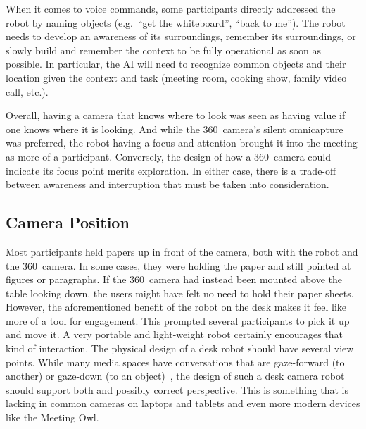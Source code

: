\documentclass{tufte-handout}
\begin{document}
When it comes to voice commands, some participants directly addressed
the robot by naming objects (e.g.\ ``get the whiteboard'', ``back to
me'').  The robot needs to develop an awareness of its surroundings,
remember its surroundings, or slowly build and remember the context to
be fully operational as soon as possible. In particular, the AI will
need to recognize common objects and their location given the context
and task (meeting room, cooking show, family video call, etc.).

Overall, having a camera that knows where to look was seen as having
value if one knows where it is looking.  And while the 360\textdegree\
camera's silent omnicapture was preferred, the robot having a focus
and attention brought it into the meeting as more of a
participant. Conversely, the design of how a 360\textdegree\ camera
could indicate its focus point merits exploration. In either case,
there is a trade-off between awareness and interruption that must be
taken into consideration.

\subsection{Camera Position}
Most participants held papers up in front of the camera, both with the
robot and the 360\textdegree\ camera. In some cases, they were holding
the paper and still pointed at figures or paragraphs. If the
360\textdegree\ camera had instead been mounted above the table
looking down, the users might have felt no need to hold their paper
sheets. However, the aforementioned benefit of the robot on the desk
makes it feel like more of a tool for engagement. This prompted
several participants to pick it up and move it. A very portable and
light-weight robot certainly encourages that kind of interaction.  The
physical design of a desk robot should have several view points.
While many media spaces have conversations that are gaze-forward (to
another) or gaze-down (to an
object)~\cite{Mok:2017:CPP:3064663.3064722}, the design of such a desk
camera robot should support both and possibly correct perspective.
This is something that is lacking in common cameras on laptops and
tablets and even more modern devices like the Meeting Owl.
\end{document}

